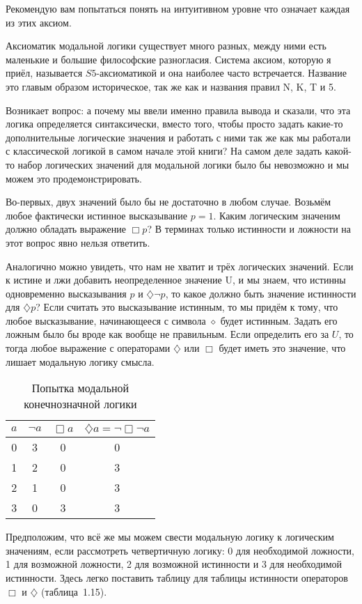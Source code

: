 Рекомендую вам попытаться понять на интуитивном уровне что означает каждая из этих аксиом.

Аксиоматик модальной логики существует много разных, между ними есть маленькие и большие философские разногласия. Система аксиом, которую я приёл, называется $S5$-аксиоматикой и она наиболее часто встречается. Название это главым образом историческое, так же как и названия правил N, K, T и 5.

Возникает вопрос: а почему мы ввели именно правила вывода и сказали, что эта логика определяется синтаксически, вместо того, чтобы просто задать какие-то дополнительные логические значения и работать с ними так же как мы работали с классической логикой в самом начале этой книги? На самом деле задать какой-то набор логических значений для модальной логики было бы невозможно и мы можем это продемонстрировать.

Во-первых, двух значений было бы не достаточно в любом случае. Возьмём любое фактически истинное высказывание $p = 1$. Каким логическим значеним должно обладать выражение $\Box p$? В терминах только истинности и ложности на этот вопрос явно нельзя ответить.

Аналогично можно увидеть, что нам не хватит и трёх логических значений. Если к истине и лжи добавить неопределенное значение U, и мы знаем, что истинны одновременно высказывания $p$ и $\diamondsuit \neg p$, то какое должно быть значение истинности для $\diamondsuit p$? Если считать это высказывание истинным, то мы придём к тому, что любое высказывание, начинающееся с символа $\diamond$ будет истинным. Задать его ложным было бы вроде как вообще не правильным. Если определить его за $U$, то тогда любое выражение с операторами $\diamondsuit$ или $\Box$ будет иметь это значение, что лишает модальную логику смысла.

\begin{table}[h]
\centering
\begin{tabular}{c | c c c}
$a$ & $\neg a$ & $\Box a$ & $\diamondsuit a = \neg\Box\neg a$ \\
\hline
0 & 3 & 0 & 0 \\
1 & 2 & 0 & 3 \\
2 & 1 & 0 & 3 \\
3 & 0 & 3 & 3
\end{tabular}
\caption{Попытка модальной конечнозначной логики}\label{table:kleene-or}
\end{table}

Предположим, что всё же мы можем свести модальную логику к логическим значениям, если рассмотреть четвертичную логику: 0 для необходимой ложности, 1 для возможной ложности, 2 для возможной истинности и 3 для необходимой истинности. Здесь легко поставить таблицу для таблицы истинности операторов $\Box$  и $\diamondsuit$ (таблица~1.15).

